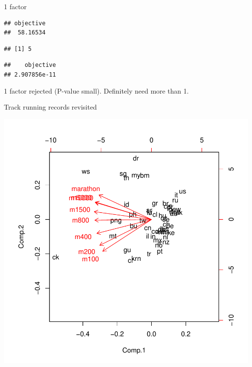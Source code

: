 \begin{frame}[fragile]{1 factor}

\begin{knitrout}
\color{fgcolor}\begin{kframe}
\begin{alltt}
\hlkwb{=}\hlstd{(}\hlstd{=}\hlstd{,}
\hlopt{$}
\end{alltt}
\begin{verbatim}
## objective 
##  58.16534
\end{verbatim}
\begin{alltt}
\hlopt{$}
\end{alltt}
\begin{verbatim}
## [1] 5
\end{verbatim}
\begin{alltt}
\hlopt{$}
\end{alltt}
\begin{verbatim}
##    objective 
## 2.907856e-11
\end{verbatim}
\end{kframe}
\end{knitrout}

1 factor rejected (P-value small). Definitely need more than 1.
  
\end{frame}

\begin{frame}[fragile]{Track running records revisited}
  
    \includegraphics[height=\textheight]{bPrincomp-biplot}

\end{frame}

